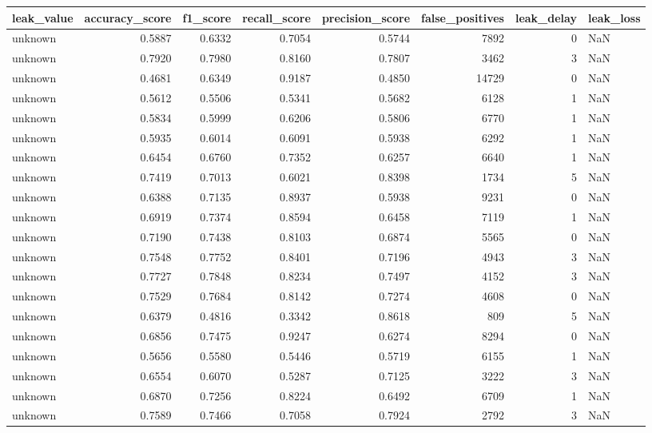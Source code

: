 \begin{tabular}{lrrrrrrl}
\toprule
leak\_value & accuracy\_score & f1\_score & recall\_score & precision\_score & false\_positives & leak\_delay & leak\_loss \\
\midrule
unknown & 0.5887 & 0.6332 & 0.7054 & 0.5744 & 7892 & 0 & NaN \\
unknown & 0.7920 & 0.7980 & 0.8160 & 0.7807 & 3462 & 3 & NaN \\
unknown & 0.4681 & 0.6349 & 0.9187 & 0.4850 & 14729 & 0 & NaN \\
unknown & 0.5612 & 0.5506 & 0.5341 & 0.5682 & 6128 & 1 & NaN \\
unknown & 0.5834 & 0.5999 & 0.6206 & 0.5806 & 6770 & 1 & NaN \\
unknown & 0.5935 & 0.6014 & 0.6091 & 0.5938 & 6292 & 1 & NaN \\
unknown & 0.6454 & 0.6760 & 0.7352 & 0.6257 & 6640 & 1 & NaN \\
unknown & 0.7419 & 0.7013 & 0.6021 & 0.8398 & 1734 & 5 & NaN \\
unknown & 0.6388 & 0.7135 & 0.8937 & 0.5938 & 9231 & 0 & NaN \\
unknown & 0.6919 & 0.7374 & 0.8594 & 0.6458 & 7119 & 1 & NaN \\
unknown & 0.7190 & 0.7438 & 0.8103 & 0.6874 & 5565 & 0 & NaN \\
unknown & 0.7548 & 0.7752 & 0.8401 & 0.7196 & 4943 & 3 & NaN \\
unknown & 0.7727 & 0.7848 & 0.8234 & 0.7497 & 4152 & 3 & NaN \\
unknown & 0.7529 & 0.7684 & 0.8142 & 0.7274 & 4608 & 0 & NaN \\
unknown & 0.6379 & 0.4816 & 0.3342 & 0.8618 & 809 & 5 & NaN \\
unknown & 0.6856 & 0.7475 & 0.9247 & 0.6274 & 8294 & 0 & NaN \\
unknown & 0.5656 & 0.5580 & 0.5446 & 0.5719 & 6155 & 1 & NaN \\
unknown & 0.6554 & 0.6070 & 0.5287 & 0.7125 & 3222 & 3 & NaN \\
unknown & 0.6870 & 0.7256 & 0.8224 & 0.6492 & 6709 & 1 & NaN \\
unknown & 0.7589 & 0.7466 & 0.7058 & 0.7924 & 2792 & 3 & NaN \\
\bottomrule
\end{tabular}
